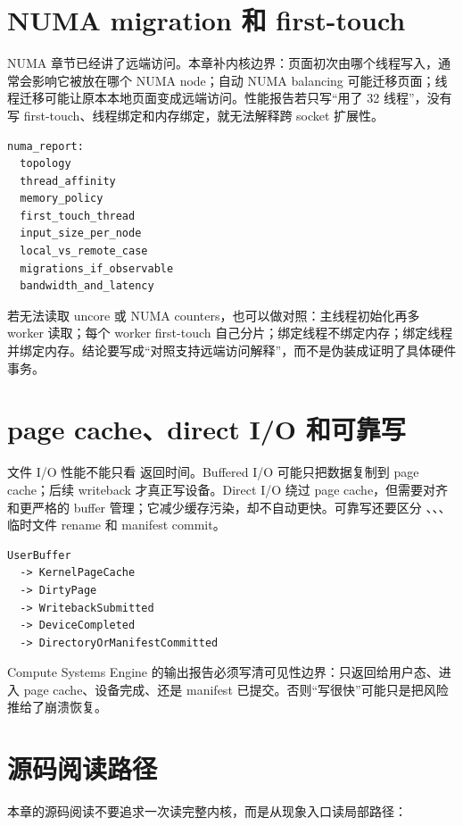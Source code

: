 \section{NUMA migration 和 first-touch}

NUMA 章节已经讲了远端访问。本章补内核边界：页面初次由哪个线程写入，通常会影响它被放在哪个 NUMA node；自动 NUMA balancing 可能迁移页面；线程迁移可能让原本本地页面变成远端访问。性能报告若只写“用了 32 线程”，没有写 first-touch、线程绑定和内存绑定，就无法解释跨 socket 扩展性。

\begin{lstlisting}[numbers=none,caption={NUMA 实验报告字段}]
numa_report:
  topology
  thread_affinity
  memory_policy
  first_touch_thread
  input_size_per_node
  local_vs_remote_case
  migrations_if_observable
  bandwidth_and_latency
\end{lstlisting}

若无法读取 uncore 或 NUMA counters，也可以做对照：主线程初始化再多 worker 读取；每个 worker first-touch 自己分片；绑定线程不绑定内存；绑定线程并绑定内存。结论要写成“对照支持远端访问解释”，而不是伪装成证明了具体硬件事务。

\section{page cache、direct I/O 和可靠写}

文件 I/O 性能不能只看  返回时间。Buffered I/O 可能只把数据复制到 page cache；后续 writeback 才真正写设备。Direct I/O 绕过 page cache，但需要对齐和更严格的 buffer 管理；它减少缓存污染，却不自动更快。可靠写还要区分 、、、临时文件 rename 和 manifest commit。

\begin{lstlisting}[numbers=none,caption={写出路径状态机}]
UserBuffer
  -> KernelPageCache
  -> DirtyPage
  -> WritebackSubmitted
  -> DeviceCompleted
  -> DirectoryOrManifestCommitted
\end{lstlisting}

Compute Systems Engine 的输出报告必须写清可见性边界：只返回给用户态、进入 page cache、设备完成、还是 manifest 已提交。否则“写很快”可能只是把风险推给了崩溃恢复。

\section{源码阅读路径}

本章的源码阅读不要追求一次读完整内核，而是从现象入口读局部路径：

